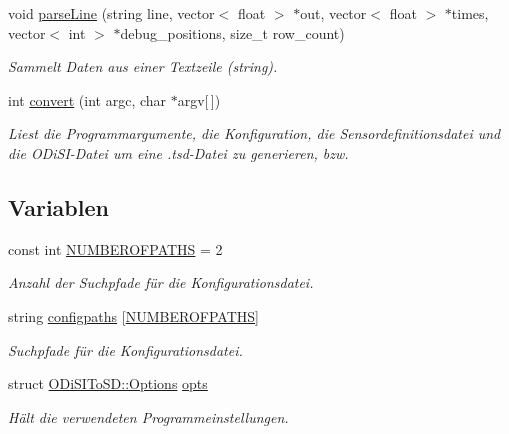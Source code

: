 \begin{DoxyCompactItemize}
void \hyperlink{namespaceODiSIToSD_a6b06d3f5276bc29ae627f6019ce4bdc3}{parse\-Line} (string line, vector$<$ float $>$ $\ast$out, vector$<$ float $>$ $\ast$times, vector$<$ int $>$ $\ast$debug\-\_\-positions, size\-\_\-t row\-\_\-count)
\begin{DoxyCompactList}\small\item\em Sammelt Daten aus einer Textzeile (string). \end{DoxyCompactList}\item 
int \hyperlink{namespaceODiSIToSD_a09e74878b7f3b12c27afbb8ee902d9f8}{convert} (int argc, char $\ast$argv\mbox{[}$\,$\mbox{]})
\begin{DoxyCompactList}\small\item\em Liest die Programmargumente, die Konfiguration, die Sensordefinitionsdatei und die O\-Di\-S\-I-\/\-Datei um eine .tsd-\/\-Datei zu generieren, bzw. \end{DoxyCompactList}\end{DoxyCompactItemize}
\subsection*{Variablen}
\begin{DoxyCompactItemize}
\item 
const int \hyperlink{namespaceODiSIToSD_ae626f83adecae71a9227d63ff6c46d82}{N\-U\-M\-B\-E\-R\-O\-F\-P\-A\-T\-H\-S} = 2
\begin{DoxyCompactList}\small\item\em Anzahl der Suchpfade für die Konfigurationsdatei. \end{DoxyCompactList}\item 
string \hyperlink{namespaceODiSIToSD_a4de5655bcf7e6e49c30d561521172f7a}{configpaths} \mbox{[}\hyperlink{namespaceODiSIToSD_ae626f83adecae71a9227d63ff6c46d82}{N\-U\-M\-B\-E\-R\-O\-F\-P\-A\-T\-H\-S}\mbox{]}
\begin{DoxyCompactList}\small\item\em Suchpfade für die Konfigurationsdatei. \end{DoxyCompactList}\item 
struct \hyperlink{structODiSIToSD_1_1Options}{O\-Di\-S\-I\-To\-S\-D\-::\-Options} \hyperlink{namespaceODiSIToSD_a80beb7db49e15d88897aec916322ec08}{opts}
\begin{DoxyCompactList}\small\item\em Hält die verwendeten Programmeinstellungen. \end{DoxyCompactList}\end{DoxyCompactItemize}


